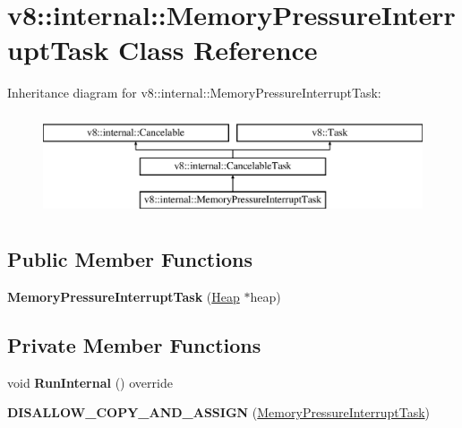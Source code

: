 \hypertarget{classv8_1_1internal_1_1_memory_pressure_interrupt_task}{}\section{v8\+:\+:internal\+:\+:Memory\+Pressure\+Interrupt\+Task Class Reference}
\label{classv8_1_1internal_1_1_memory_pressure_interrupt_task}
Inheritance diagram for v8\+:\+:internal\+:\+:Memory\+Pressure\+Interrupt\+Task\+:\begin{figure}[H]
\begin{center}
\leavevmode
\includegraphics[height=3.000000cm]{classv8_1_1internal_1_1_memory_pressure_interrupt_task}
\end{center}
\end{figure}
\subsection*{Public Member Functions}
\begin{DoxyCompactItemize}
\item 
{\bfseries Memory\+Pressure\+Interrupt\+Task} (\hyperlink{classv8_1_1internal_1_1_heap}{Heap} $\ast$heap)\hypertarget{classv8_1_1internal_1_1_memory_pressure_interrupt_task_aaf283c13796191e6e4a1d2cb13b7cf42}{}\label{classv8_1_1internal_1_1_memory_pressure_interrupt_task_aaf283c13796191e6e4a1d2cb13b7cf42}

\end{DoxyCompactItemize}
\subsection*{Private Member Functions}
\begin{DoxyCompactItemize}
\item 
void {\bfseries Run\+Internal} () override\hypertarget{classv8_1_1internal_1_1_memory_pressure_interrupt_task_af02d8c6c1ef17e0b02b0d7e7c10a48ca}{}\label{classv8_1_1internal_1_1_memory_pressure_interrupt_task_af02d8c6c1ef17e0b02b0d7e7c10a48ca}

\item 
{\bfseries D\+I\+S\+A\+L\+L\+O\+W\+\_\+\+C\+O\+P\+Y\+\_\+\+A\+N\+D\+\_\+\+A\+S\+S\+I\+GN} (\hyperlink{classv8_1_1internal_1_1_memory_pressure_interrupt_task}{Memory\+Pressure\+Interrupt\+Task})\hypertarget{classv8_1_1internal_1_1_memory_pressure_interrupt_task_ae129d0681631f6ded50fbc98c072717c}{}\label{classv8_1_1internal_1_1_memory_pressure_interrupt_task_ae129d0681631f6ded50fbc98c072717c}

\end{DoxyCompactItemize}
